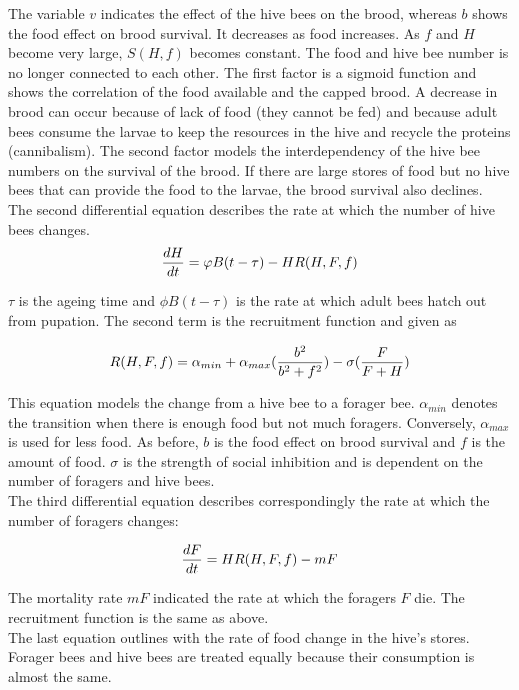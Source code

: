 	The variable $v$ indicates the effect of the hive bees on the brood, whereas $b$ shows the food effect on brood survival. It decreases as food increases. As $f$ and $H$ become very large, $S(H,f)$ becomes constant. The food and hive bee number is no longer connected to each other. The first factor is a sigmoid function and shows the correlation of the food available and the capped brood. A decrease in brood can occur because of lack of food (they cannot be fed) and because adult bees consume the larvae to keep the resources in the hive and recycle the proteins (cannibalism). The second factor models the interdependency of the hive bee numbers on the survival of the brood. If there are large stores of food but no hive bees that can provide the food to the larvae, the brood survival also declines.  
	\\
	The second differential equation describes the rate at which the number of hive bees changes.	
	\begin{equation}\label{eq:changeHiveBees}
		{dH \over dt}=\phi B(t-\tau)-HR(H,F,f)
	\end{equation}
	
	$\tau$ is the ageing time and $\phi B(t-\tau)$ is the rate at which adult bees hatch out from pupation. The second term is the recruitment function and given as
		
		\begin{equation}\label{eq:recruitmentFunction}
			R(H,F,f) = \alpha_{min} + \alpha_{max}({b^2 \over b^2+f^2})-\sigma({F \over F+H})
		\end{equation}
				
	This equation models the change from a hive bee to a forager bee. $\alpha_{min}$ denotes the transition when there is enough food but not much foragers. Conversely, $\alpha_{max}$ is used for less food. As before, $b$ is the food effect on brood survival and $f$ is the amount of food. $\sigma$ is the strength of social inhibition and is dependent on the number of foragers and hive bees.\\
	The third differential equation describes correspondingly the rate at which the number of foragers changes:
	
	\begin{equation}\label{eq:changeForagers}
		{dF \over dt} = HR(H,F,f)-m F
	\end{equation}
	
	The mortality rate $mF$ indicated the rate at which the foragers $F$ die. The recruitment function is the same as above.\\	
	The last equation outlines with the rate of food change in the hive's stores. Forager bees and hive bees are treated equally because their consumption is almost the same. 
	
